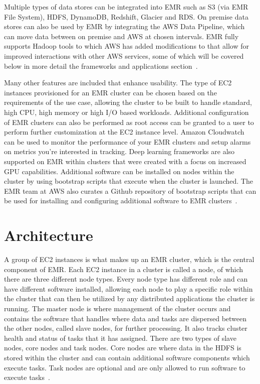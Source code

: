 Multiple types of data stores can be integrated into EMR such as S3 (via EMR File System), HDFS, DynamoDB, Redshift, Glacier and RDS. On premise data stores can also be used by EMR by integrating the AWS Data Pipeline, which can move data between on premise and AWS at chosen intervals. EMR fully supports Hadoop tools to which AWS has added modifications to that allow for improved interactions with other AWS services, some of which will be covered below in more detail the frameworks and applications section~\cite{hid-sp18-521-amazonemr-details}.  

Many other features are included that enhance usability. The type of EC2 instances provisioned for an EMR cluster can be chosen based on the requirements of the use case, allowing the cluster to be built to handle standard, high CPU, high memory or high I/O based workloads. Additional configuration of EMR clusters can also be performed as root access can be granted to a user to perform further customization at the EC2 instance level. Amazon Cloudwatch can be used to monitor the performance of your EMR clusters and setup alarms on metrics you're interested in tracking. Deep learning frameworks are also supported on EMR within clusters that were created with a focus on increased GPU capabilities. Additional software can be installed on nodes within the cluster by using bootstrap scripts that execute when the cluster is launched. The EMR team at AWS also curates a Github repository of bootstrap scripts that can be used for installing and configuring additional software to EMR clusters~\cite{hid-sp18-521-amazonemr-details}. 

\section{Architecture}

A group of EC2 instances is what makes up an EMR cluster, which is the central component of EMR. Each EC2 instance in a cluster is called a node, of which there are three different node types. Every node type has different role and can have different software installed, allowing each node to play a specific role within the cluster that can then be utilized by any distributed applications the cluster is running. The master node is where management of the cluster occurs and contains the software that handles where data and tasks are dispersed between the other nodes, called slave nodes, for further processing. It also tracks cluster health and status of tasks that it has assigned. There are two types of slave nodes, core nodes and task nodes. Core nodes are where data in the HDFS is stored within the cluster and can contain additional software components which execute tasks. Task nodes are optional and are only allowed to run software to execute tasks~\cite{hid-sp18-521-amazonemr-overview}. 

